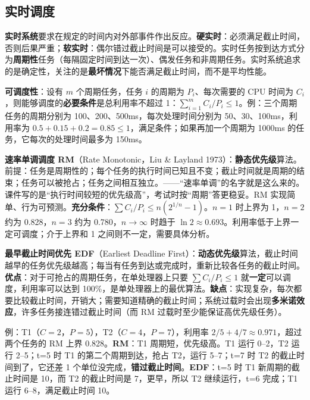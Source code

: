 \subsection{实时调度}

\textbf{实时系统}要求在规定的时间内对外部事件作出反应。\textbf{硬实时}：必须满足截止时间，否则后果严重；\textbf{软实时}：偶尔错过截止时间是可以接受的。实时任务按到达方式分为\textbf{周期性}任务（每隔固定时间到达一次）、偶发任务和非周期任务。实时系统追求的是确定性，关注的是\textbf{最坏情况}下能否满足截止时间，而不是平均性能。

\textbf{可调度性}：设有 $m$ 个周期任务，任务 $i$ 的周期为 $P_i$、每次需要的 CPU 时间为 $C_i$，则能够调度的\textbf{必要条件}是总利用率不超过 1：$\sum_{i=1}^{m} C_i/P_i \le 1$。例：三个周期任务的周期分别为 100、200、500ms，每次处理时间分别为 50、30、100ms，利用率为 $0.5 + 0.15 + 0.2 = 0.85 \le 1$，满足条件；如果再加一个周期为 1000ms 的任务，它每次的处理时间最多为 150ms。

\textbf{速率单调调度 RM}（Rate Monotonic，Liu \& Layland 1973）：\textbf{静态优先级}算法。前提：任务是周期性的；每个任务的执行时间已知且不变；截止时间就是周期的结束；任务可以被抢占；任务之间相互独立。\ez {}——“速率单调”的名字就是这么来的。课件写的是“执行时间较短的优先级高”，考试时按“周期”答更稳妥。RM 实现简单、行为可预测。\textbf{充分条件}：$\sum C_i/P_i \le n(2^{1/n}-1)$。$n=1$ 时上界为 1，$n=2$ 约为 0.828，$n=3$ 约为 0.780，$n \to \infty$ 时趋于 $\ln 2 \approx 0.693$。利用率低于上界一定可调度；介于上界和 1 之间则不一定，需要具体分析。

\textbf{最早截止时间优先 EDF}（Earliest Deadline First）：\textbf{动态优先级}算法，截止时间越早的任务优先级越高；每当有任务到达或完成时，重新比较各任务的截止时间。\textbf{优点}：对于可抢占的周期任务，在单处理器上只要 $\sum C_i/P_i \le 1$ 就\textbf{一定}可以调度，利用率可以达到 100\%，是单处理器上的最优算法。\textbf{缺点}：实现复杂，每次都要比较截止时间，开销大；需要知道精确的截止时间；系统过载时会出现\textbf{多米诺效应}，许多任务接连错过截止时间（而 RM 过载时至少能保证高优先级任务）。

例：T1（$C=2$，$P=5$），T2（$C=4$，$P=7$），利用率 $2/5 + 4/7 \approx 0.971$，超过两个任务的 RM 上界 0.828。\textbf{RM}：T1 周期短，优先级高。T1 运行 0–2，T2 运行 2–5；t=5 时 T1 的第二个周期到达，抢占 T2，运行 5–7；t=7 时 T2 的截止时间到了，它还差 1 个单位没完成，\textbf{错过截止时间}。\textbf{EDF}：t=5 时 T1 新周期的截止时间是 10，而 T2 的截止时间是 7，更早，所以 T2 继续运行，t=6 完成；T1 运行 6–8，满足截止时间 10。

